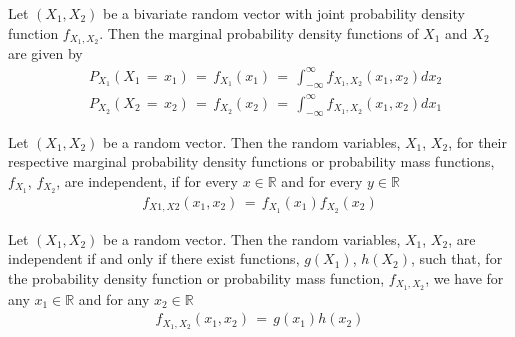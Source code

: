 \begin{theorem}
    Let $(X_{1}, X_{2})$ be a bivariate random vector with joint probability density function $f_{X_{1}, X_{2}}$. Then the marginal probability density functions of $X_{1}$ and $X_{2}$ are given by
    \begin{align*}
        &P_{X_{1}}(X_{1} \hspace{2pt} = \hspace{2pt} x_{1}) \hspace{2pt} = \hspace{2pt} f_{X_{1}}(x_{1}) \hspace{2pt} = \hspace{2pt} \int_{-\infty}^{\infty} f_{X_{1}, X_{2}}(x_{1}, x_{2}) dx_{2} \\[1ex]
        &P_{X_{2}}(X_{2} \hspace{2pt} = \hspace{2pt} x_{2}) \hspace{2pt} = \hspace{2pt} f_{X_{2}}(x_{2}) \hspace{2pt} = \hspace{2pt} \int_{-\infty}^{\infty} f_{X_{1}, X_{2}}(x_{1}, x_{2}) dx_{1}
    \end{align*}
\end{theorem}

\begin{definition}
    Let $(X_{1}, X_{2})$ be a random vector. Then the random variables, $X_{1}$, $X_{2}$, for their respective marginal probability density functions or probability mass functions, $f_{X_{1}}$, $f_{X_{2}}$, are independent, if for every $x \in \mathbb{R}$ and for every $y \in \mathbb{R}$
    \begin{align*}
        f_{X{1}, X{2}}(x_{1}, x_{2}) \hspace{2pt} = \hspace{2pt} f_{X_{1}}(x_{1}) f_{X_{2}}(x_{2})
    \end{align*}
\end{definition}

\begin{theorem}
    Let $(X_{1}, X_{2})$ be a random vector. Then the random variables, ${X_{1}}$, ${X_{2}}$, are independent if and only if there exist functions, $g(X_{1})$, $h(X_{2})$, such that, for the probability density function or probability mass function, $f_{X_{1}, X_{2}}$, we have for any $x_{1} \in \mathbb{R}$ and for any $x_{2} \in \mathbb{R}$
    \begin{align*}
        f_{X_{1}, X_{2}}(x_{1}, x_{2}) \hspace{2pt} = \hspace{2pt} g(x_{1}) h(x_{2})
    \end{align*}
\end{theorem}

